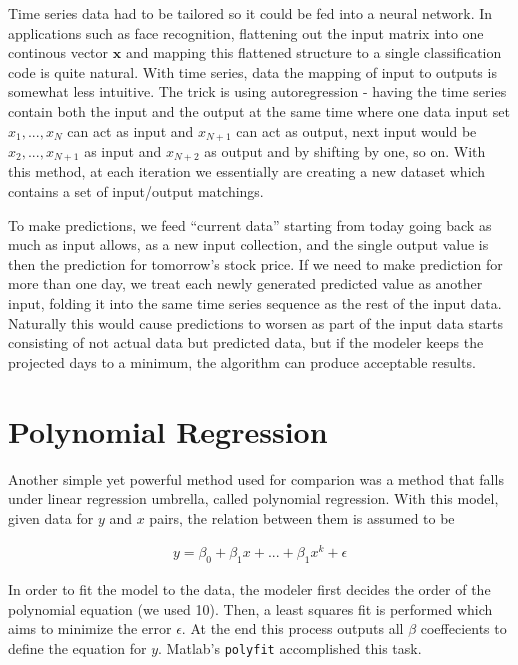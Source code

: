 Time series data had to be tailored so it could be fed into a neural network. In
applications such as face recognition, flattening out the input matrix into one
continous vector $\mathbf{x}$ and mapping this flattened structure to a single
classification code is quite natural. With time series, data the mapping of
input to outputs is somewhat less intuitive. The trick is using autoregression -
having the time series contain both the input and the output at the same time
where one data input set $x_1,...,x_N$ can act as input and $x_{N+1}$ can act as
output, next input would be $x_2,...,x_{N+1}$ as input and $x_{N+2}$ as output
and by shifting by one, so on. With this method, at each iteration we
essentially are creating a new dataset which contains a set of input/output
matchings.

To make predictions, we feed ``current data'' starting from today going back as
much as input allows, as a new input collection, and the single output value is
then the prediction for tomorrow's stock price. If we need to make prediction
for more than one day, we treat each newly generated predicted value as another
input, folding it into the same time series sequence as the rest of the input
data. Naturally this would cause predictions to worsen as part of the input data
starts consisting of not actual data but predicted data, but if the modeler
keeps the projected days to a minimum, the algorithm can produce acceptable
results.

\section{Polynomial Regression}

Another simple yet powerful method used for comparion was a method that falls
under linear regression umbrella, called polynomial regression. With this model,
given data for $y$ and $x$ pairs, the relation between them is assumed to be

\begin{eqnarray*}
y = \beta_0 + \beta_1x + ... + \beta_1x^k + \epsilon
\end{eqnarray*}

In order to fit the model to the data, the modeler first decides the order of
the polynomial equation (we used 10). Then, a least squares fit is performed
which aims to minimize the error $\epsilon$. At the end this process outputs all
$\beta$ coeffecients to define the equation for $y$. Matlab's \verb!polyfit!
accomplished this task.

